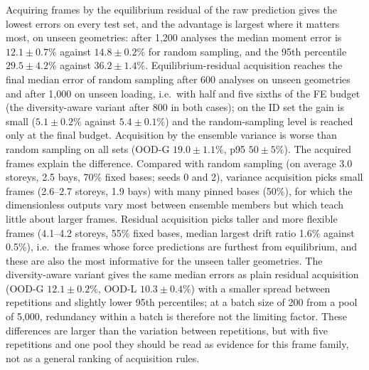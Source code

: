 Acquiring frames by the equilibrium residual of the raw prediction gives the lowest errors on every test set, and the advantage is largest where it matters most, on unseen geometries: after 1{,}200 analyses the median moment error is $12.1\pm0.7\%$ against $14.8\pm0.2\%$ for random sampling, and the 95th percentile $29.5\pm4.2\%$ against $36.2\pm1.4\%$. Equilibrium-residual acquisition reaches the final median error of random sampling after 600 analyses on unseen geometries and after 1{,}000 on unseen loading, i.e.\ with half and five sixths of the FE budget (the diversity-aware variant after 800 in both cases); on the ID set the gain is small ($5.1\pm0.2\%$ against $5.4\pm0.1\%$) and the random-sampling level is reached only at the final budget. Acquisition by the ensemble variance is worse than random sampling on all sets (OOD-G $19.0\pm1.1\%$, p95 $50\pm5\%$). The acquired frames explain the difference. Compared with random sampling (on average 3.0 storeys, 2.5 bays, 70\% fixed bases; seeds 0 and 2), variance acquisition picks small frames (2.6--2.7 storeys, 1.9 bays) with many pinned bases (50\%), for which the dimensionless outputs vary most between ensemble members but which teach little about larger frames. Residual acquisition picks taller and more flexible frames (4.1--4.2 storeys, 55\% fixed bases, median largest drift ratio 1.6\% against 0.5\%), i.e.\ the frames whose force predictions are furthest from equilibrium, and these are also the most informative for the unseen taller geometries. The diversity-aware variant gives the same median errors as plain residual acquisition (OOD-G $12.1\pm0.2\%$, OOD-L $10.3\pm0.4\%$) with a smaller spread between repetitions and slightly lower 95th percentiles; at a batch size of 200 from a pool of 5{,}000, redundancy within a batch is therefore not the limiting factor. These differences are larger than the variation between repetitions, but with five repetitions and one pool they should be read as evidence for this frame family, not as a general ranking of acquisition rules.
